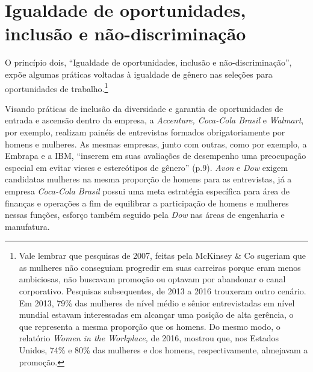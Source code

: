 \section{Igualdade de oportunidades, inclusão e não-discriminação}

O princípio dois, ``Igualdade de oportunidades, inclusão e
não-discriminação'', expõe algumas práticas voltadas à igualdade de
gênero nas seleções para oportunidades de trabalho.\footnote{Vale
  lembrar que pesquisas de 2007, feitas pela McKinsey \& Co sugeriam que
  as mulheres não conseguiam progredir em suas carreiras porque eram
  menos ambiciosas, não buscavam promoção ou optavam por abandonar o
  canal corporativo. Pesquisas subsequentes, de 2013 a 2016 trouxeram
  outro cenário. Em 2013, 79\% das mulheres de nível médio e sênior
  entrevistadas em nível mundial estavam interessadas em alcançar uma
  posição de alta gerência, o que representa a mesma proporção que os
  homens. Do mesmo modo, o relatório \emph{Women in the Workplace,} de
  2016, mostrou que, nos Estados Unidos, 74\% e 80\% das mulheres e dos
  homens, respectivamente, almejavam a promoção.}

Visando práticas de inclusão da diversidade e garantia de oportunidades
de entrada e ascensão dentro da empresa, a \emph{Accenture, Coca-Cola
Brasil} e \emph{Walmart}, por exemplo, realizam painéis de entrevistas
formados obrigatoriamente por homens e mulheres. As mesmas empresas,
junto com outras, como por exemplo, a Embrapa e a IBM, ``inserem em suas
avaliações de desempenho uma preocupação especial em evitar vieses e
estereótipos de gênero'' (p.9). \emph{Avon} e \emph{Dow} exigem
candidatas mulheres na mesma proporção de homens para as entrevistas, já
a empresa \emph{Coca-Cola Brasil} possui uma meta estratégia específica
para área de finanças e operações a fim de equilibrar a participação de
homens e mulheres nessas funções, esforço também seguido pela \emph{Dow}
nas áreas de engenharia e manufatura.


